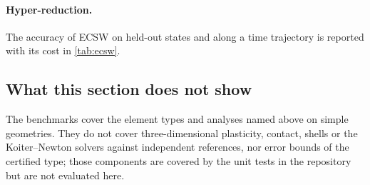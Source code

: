 \paragraph{Hyper-reduction.}
The accuracy of ECSW on held-out states and along a time trajectory is reported with its cost in \cref{tab:ecsw}.

\subsection{What this section does not show}
The benchmarks cover the element types and analyses named above on simple geometries. They do not cover three-dimensional plasticity, contact, shells or the Koiter--Newton solvers against independent references, nor error bounds of the certified type; those components are covered by the unit tests in the repository but are not evaluated here.
